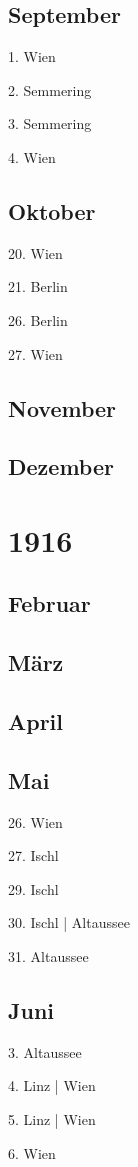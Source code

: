 \documentclass[twoside=false,titlepage=false,open=any, parskip=never, fontsize=10pt, headings=small, chapterprefix=false, appendixprefix=false, DIV=15]{scrbook}
\begin{document}
\begin{multicols}{3}
            \section*{September}
            1. Wien\par
            2. Semmering\par
            3. Semmering\par
            4. Wien\par
            \section*{Oktober}
            20. Wien\par
            21. Berlin\par
            26. Berlin\par
            27. Wien\par
            \section*{November}
            \section*{Dezember}
            \chapter*{1916}
            \section*{Februar}
            \section*{März}
            \section*{April}
            \section*{Mai}
            26. Wien\par
            27. Ischl\par
            29. Ischl\par
            30. Ischl | Altaussee\par
            31. Altaussee\par
            \section*{Juni}
            3. Altaussee\par
            4. Linz | Wien\par
            5. Linz | Wien\par
            6. Wien\par

\end{multicols}
\end{document}
